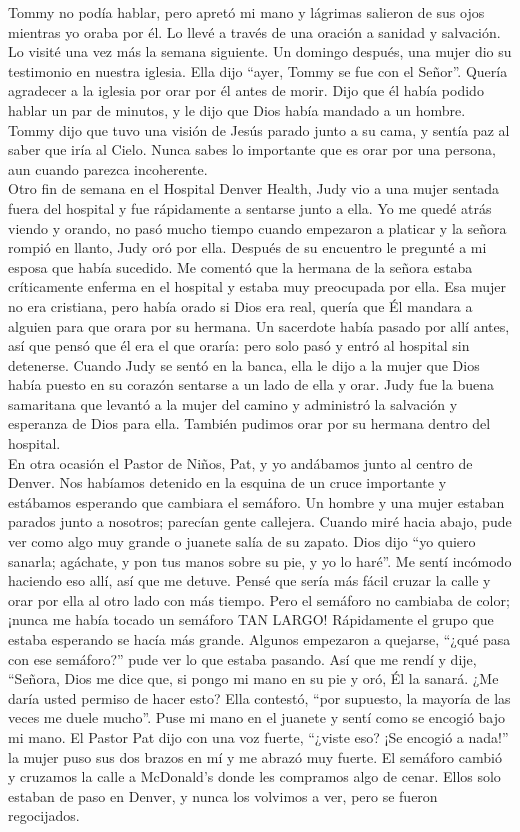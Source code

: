 \documentclass[twoside, 12pt]{book}
\begin{document}
Tommy no podía hablar, pero apretó mi mano y lágrimas salieron de sus ojos mientras yo oraba por él. Lo llevé a través de una oración a sanidad y salvación. Lo visité una vez más la semana siguiente. Un domingo después, una mujer dio su testimonio en nuestra iglesia. Ella dijo “ayer, Tommy se fue con el Señor”. Quería agradecer a la iglesia por orar por él antes de morir. Dijo que él había podido hablar un par de minutos, y le dijo que Dios había mandado a un hombre. Tommy dijo que tuvo una visión de Jesús parado junto a su cama, y sentía paz al saber que iría al Cielo. Nunca sabes lo importante que es orar por una persona, aun cuando parezca incoherente.\\
 
Otro fin de semana en el Hospital Denver Health, Judy vio a una mujer sentada fuera del hospital y fue rápidamente a sentarse junto a ella. Yo me quedé atrás viendo y orando, no pasó mucho tiempo cuando empezaron a platicar y la señora rompió en llanto, Judy oró por ella. Después de su encuentro le pregunté a mi esposa que había sucedido. Me comentó que la hermana de la señora estaba críticamente enferma en el hospital y estaba muy preocupada por ella. Esa mujer no era cristiana, pero había orado si Dios era real, quería que Él mandara a alguien para que orara por su hermana. Un sacerdote había pasado por allí antes, así que pensó que él era el que oraría: pero solo pasó y entró al hospital sin detenerse. Cuando Judy se sentó en la banca, ella le dijo a la mujer que Dios había puesto en su corazón sentarse a un lado de ella y orar. Judy fue la buena samaritana que levantó a la mujer del camino y administró la salvación y esperanza de Dios para ella. También pudimos orar por su hermana dentro del hospital.\\

En otra ocasión el Pastor de Niños, Pat, y yo andábamos junto al centro de Denver. Nos habíamos detenido en la esquina de un cruce importante y estábamos esperando que cambiara el semáforo. Un hombre y una mujer estaban parados junto a nosotros; parecían gente callejera. Cuando miré hacia abajo, pude ver como algo muy grande o juanete salía de su zapato. Dios dijo “yo quiero sanarla; agáchate, y pon tus manos sobre su pie, y yo lo haré”. Me sentí incómodo haciendo eso allí, así que me detuve. Pensé que sería más fácil cruzar la calle y orar por ella al otro lado con más tiempo. Pero el semáforo no cambiaba de color; ¡nunca me había tocado un semáforo TAN LARGO! Rápidamente el grupo que estaba esperando se hacía más grande. Algunos empezaron a quejarse, “¿qué pasa con ese semáforo?” pude ver lo que estaba pasando. Así que me rendí y dije, “Señora, Dios me dice que, si pongo mi mano en su pie y oró, Él la sanará. ¿Me daría usted permiso de hacer esto? Ella contestó, “por supuesto, la mayoría de las veces me duele mucho”. Puse mi mano en el juanete y sentí como se encogió bajo mi mano. El Pastor Pat dijo con una voz fuerte, “¿viste eso? ¡Se encogió a nada!” la mujer puso sus dos brazos en mí y me abrazó muy fuerte. El semáforo cambió y cruzamos la calle a McDonald’s donde les compramos algo de cenar. Ellos solo estaban de paso en Denver, y nunca los volvimos a ver, pero se fueron regocijados.\\
\end{document}
